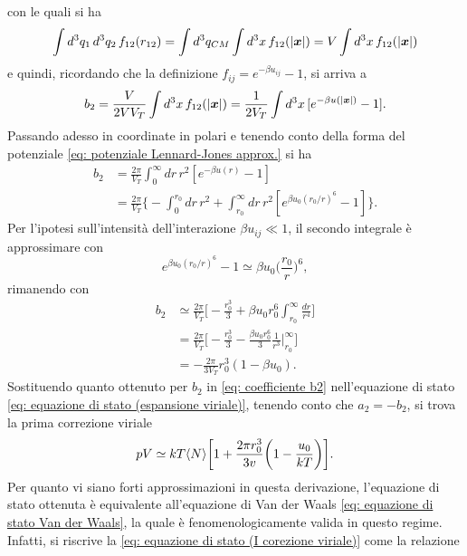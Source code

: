con le quali si ha
\begin{equation}
    \int d^3q_1\,d^3q_2\,f_{12}(r_{12}) = \int d^3q_{CM}\int d^3x\,f_{12}(|\bm{x}|) = V\int d^3x\,f_{12}(|\bm{x}|)
\end{equation}
e quindi, ricordando che la definizione $f_{ij} = e^{-\beta u_{ij}} - 1 $, si arriva a
\begin{equation}
    b_2 = \frac{V}{2VV_T}\int d^3x\,f_{12}(|\bm{x}|) = \frac{1}{2V_T}\int d^3x\,[e^{-\beta u(|\bm{x}|)} - 1].
\end{equation}
Passando adesso in coordinate in polari e tenendo conto della forma del potenziale \eqref{eq: potenziale Lennard-Jones approx.} si ha
\begin{equation}
    \begin{split}
        b_2 &= \frac{2\pi}{V_T}\int_0^\infty dr\,r^2[e^{-\beta u(r)} - 1] \\
        &= \frac{2\pi}{V_T}\bigg\{-\int_0^{r_0}dr\,r^2 + \int_{r_0}^\infty dr\,r^2[e^{\beta u_0(r_0/r)^6} - 1]\bigg\}.
    \end{split} 
\end{equation}
Per l'ipotesi sull'intensità dell'interazione $\beta u_{ij} \ll 1$, il secondo integrale è approssimare con
\begin{equation}
    e^{\beta u_0(r_0/r)^6} - 1 \simeq \beta u_0\bigg(\frac{r_0}{r}\bigg)^6,
\end{equation}
rimanendo con
\begin{equation}
\label{eq: coefficiente b2}
    \begin{split}
        b_2 &\simeq \frac{2\pi}{V_T}\bigg[-\frac{r_0^3}{3} + \beta u_0r_0^6\int_{r_0}^\infty \frac{dr}{r^4}\bigg] \\
        &= \frac{2\pi}{V_T}\bigg[-\frac{r_0^3}{3} - \frac{\beta u_0r_0^6}{3}\frac{1}{r^3}\bigg|_{r_0}^\infty\bigg] \\
        &= -\frac{2\pi}{3V_T}r_0^3(1 - \beta u_0).
    \end{split} 
\end{equation}
Sostituendo quanto ottenuto per $b_2$ in \eqref{eq: coefficiente b2} nell'equazione di stato \eqref{eq: equazione di stato (espansione viriale)}, tenendo conto che $a_2 = -b_2$, si trova la prima correzione viriale
\begin{equation}
\label{eq: equazione di stato (I corezione viriale)}
    pV \simeq kT\langle N \rangle\bigg[1 + \frac{2\pi r_0^3}{3v}\bigg(1 - \frac{u_0}{kT}\bigg)\bigg].
\end{equation}
Per quanto vi siano forti approssimazioni in questa derivazione, l'equazione di stato ottenuta è equivalente all'equazione di Van der Waals \eqref{eq: equazione di stato Van der Waals}, la quale è fenomenologicamente valida in questo regime. Infatti, si riscrive la \eqref{eq: equazione di stato (I corezione viriale)} come la relazione
